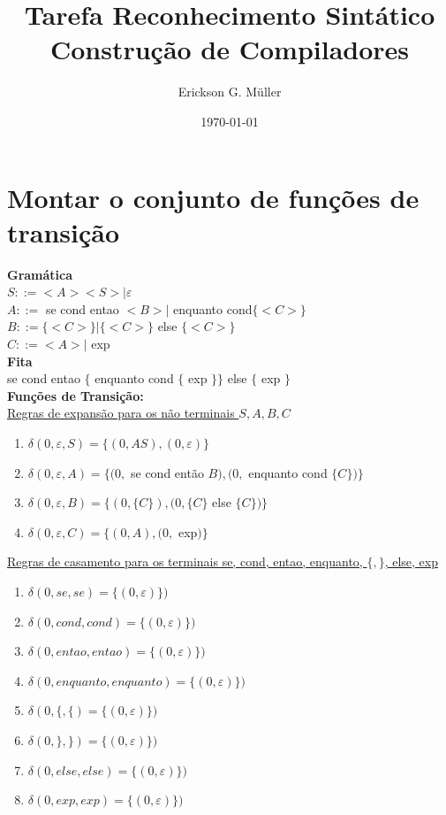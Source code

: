 \documentclass[ 12pt, a4paper]{article}
\title{Tarefa Reconhecimento Sintático\\Construção de Compiladores}
\author{Erickson G. Müller}
\date{\today}
\begin{document}
\maketitle
\thispagestyle{empty}
\section{Montar o conjunto de funções de transição}

	\textbf{Gramática}\\
	$S::=<A> <S>|\varepsilon$\\
	$A::=$ se cond entao $<B> |$ enquanto cond$ \{<C>\}$\\
	$B::= \{<C>\} | \{<C>\} $ else $\{<C>\}$\\			
	$C::= <A> |$ exp\\
	
	\textbf{Fita}\\
	se cond entao $\{$ enquanto cond $\{$ exp $\}\}$ else $\{$ exp $\}$\\
						
	\textbf{Funções de Transição:}\\
	
		\underline{ Regras de expansão para os não terminais $S, A, B , C$ }
	\begin{enumerate}[]
		\item	$\delta(0,\varepsilon,S) = \{(0,A S), (0, \varepsilon)\}$
		\item	$\delta(0, \varepsilon, A) = \{(0,$ se cond então $B),(0,$ enquanto cond $\{C\})\}$
		\item	$\delta(0,\varepsilon,B) = \{ (0, \{C\}), (0, \{C\}$ else $\{C\})\}$
		\item	$\delta(0,\varepsilon,C) = \{ (0, A), (0,$ exp$)\}$		
	\end{enumerate}
	
		\underline{ Regras de casamento para os terminais se, cond, entao, enquanto, $\{, \}$, else, exp }
	\begin{enumerate}[start=5]

		\item 	$\delta(0, se, se) = \{(0, \varepsilon)\})$
		\item	$\delta(0, cond, cond) = \{(0, \varepsilon)\})$
		\item	$\delta(0, entao, entao) = \{(0, \varepsilon)\})$
		\item	$\delta(0, enquanto, enquanto) = \{(0, \varepsilon)\})$
		\item	$\delta(0, \{, \{) = \{(0, \varepsilon)\})$
		\item	$\delta(0, \}, \}) = \{(0, \varepsilon)\})$
		\item	$\delta(0, else, else) = \{(0, \varepsilon)\})$
		\item	$\delta(0, exp, exp) = \{(0, \varepsilon)\})$
	\end{enumerate}
\end{document}
